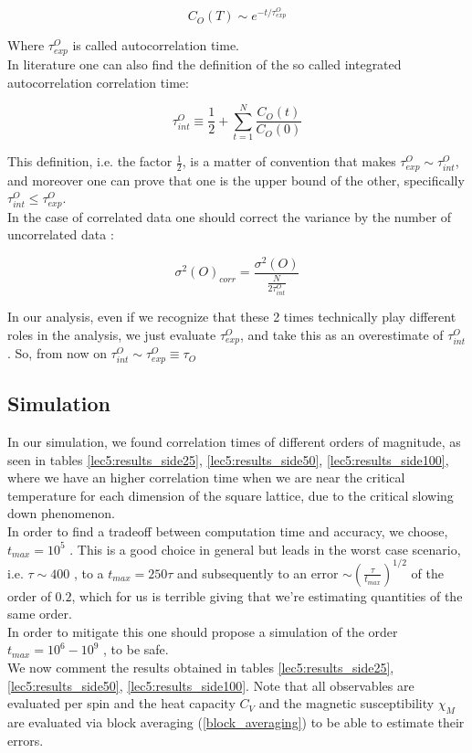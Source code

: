 $$ C_O(T) \sim e^{-t/\tau^O_{exp}} $$

Where $\tau^O_{exp}$ is called autocorrelation time. \\
In literature \cite{Weigel-2010} one can also find the definition of the so called integrated autocorrelation correlation time:

$$ \tau^O_{int} \equiv \frac{1}{2} + \sum_{t=1}^N \frac{C_O(t)}{C_O(0)} $$

This definition, i.e. the factor $\frac{1}{2}$, is a matter of convention \cite{Sokal1997} that makes $\tau^O_{exp} \sim \tau^O_{int}$, and moreover one can prove \cite{Weigel-2010} that one is the upper bound of the other, specifically $\tau^O_{int} \leq \tau^O_{exp}$. \\
In the case of correlated data one should correct the variance by the number of uncorrelated data \cite{Weigel-2010} :

$$ \sigma^2(O)_{corr} = \frac{\sigma^2(O)}{\frac{N}{2 \tau_{int}^O}} $$

In our analysis, even if we recognize that these 2 times technically play different roles in the analysis, we just evaluate $\tau^O_{exp}$, and take this as an overestimate of $\tau^O_{int}$. So, from now on $\tau^O_{int} \sim \tau^O_{exp} \equiv \tau_{O}$

\subsection{Simulation}

In our simulation, we found correlation times of different orders of magnitude, as seen in tables \ref{lec5:results_side25}, \ref{lec5:results_side50}, \ref{lec5:results_side100}, where 
we have an higher correlation time when we are near the critical temperature for each dimension of the square lattice, due to the critical slowing down phenomenon. \\
In order to find a tradeoff between computation time and accuracy, we choose, $t_{max} = 10^5$ . This is a good choice in general but leads in the worst case scenario, i.e. $\tau \sim 400$ , to 
a $t_{max} = 250 \tau$ and subsequently to an error $\sim (\frac{\tau}{t_{max}})^{1/2}$ of the order of $0.2$, which for us is terrible giving that we're estimating quantities of 
the same order. \\
In order to mitigate this one should propose a simulation of the order $t_{max} = 10^6 - 10^9$ , to be safe. \\

We now comment the results obtained in tables \ref{lec5:results_side25}, \ref{lec5:results_side50}, \ref{lec5:results_side100}. Note that all observables are evaluated 
per spin and the heat capacity $C_V$ and the magnetic susceptibility $\chi_M$ are evaluated via block averaging (\ref{block_averaging}) to be able to estimate their errors. 

